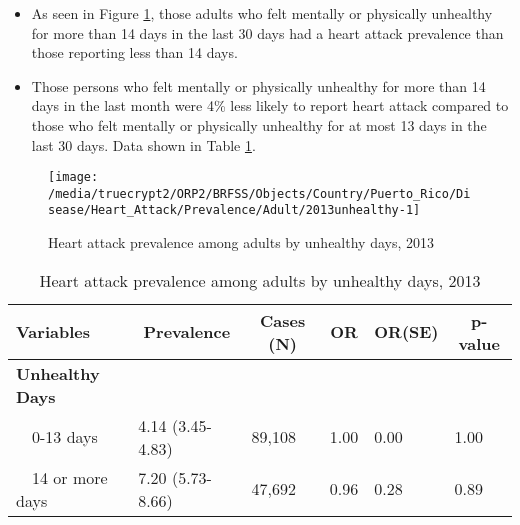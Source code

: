 \newpage
\begin{itemize}

\item As seen in Figure \ref{fig:unhlthy.Heart_Attack.2013}, those adults who felt mentally or physically unhealthy for more than 14 days in the last 30 days had a  
heart attack prevalence than those reporting less than 14 days.


\item Those persons who felt mentally or physically unhealthy for more than 14 days in the last month were 4\% less likely to report heart attack compared to those who felt mentally or physically unhealthy for at most 13 days in the last 30 days. Data shown in Table \ref{tab:unhlthy.Heart_Attack.2013}.

\end{itemize}

\begin{figure}[H]
\caption{Heart attack prevalence among adults by unhealthy days, 2013}
\label{fig:unhlthy.Heart_Attack.2013}

\begin{knitrout}
\color{fgcolor}

{\centering \texttt{[image: /media/truecrypt2/ORP2/BRFSS/Objects/Country/Puerto\_Rico/Disease/Heart\_Attack/Prevalence/Adult/2013unhealthy-1]} 

}


\end{knitrout}
\end{figure}

\begin{table}[H]
\caption{Heart attack prevalence among adults by unhealthy days, 2013\label{tab:unhlthy.Heart_Attack.2013}} 
\begin{center}
\begin{tabular}{llllll}
\hline\hline
\multicolumn{1}{l}{Variables}&\multicolumn{1}{c}{Prevalence}&\multicolumn{1}{c}{Cases (N)}&\multicolumn{1}{c}{OR}&\multicolumn{1}{c}{OR(SE)}&\multicolumn{1}{c}{p-value}\tabularnewline
\hline
{\bfseries Unhealthy Days}&&&&&\tabularnewline
~~0-13 days&4.14 (3.45-4.83)&89,108&1.00&0.00&1.00\tabularnewline
~~14 or more days&7.20 (5.73-8.66)&47,692&0.96&0.28&0.89\tabularnewline
\hline
\end{tabular}\end{center}

\end{table}

